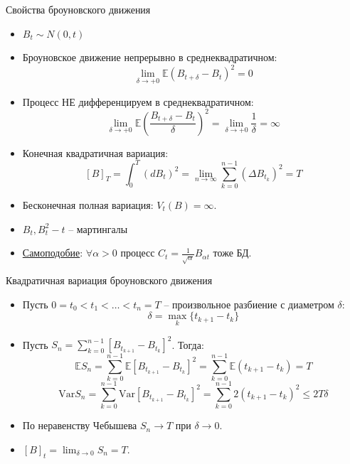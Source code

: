 \documentclass{beamer}
\begin{document}
\begin{frame}{Свойства броуновского движения}
    \begin{itemize}
        \item $B_t \sim N(0, t)$
         
        \item Броуновское движение непрерывно в среднеквадратичном:
        $$
            \lim_{\delta \to +0}\mathbb{E} \left( B_{t+\delta} - B_t \right)^2 = 0
        $$
         
        \item Процесс НЕ дифференцируем в среднеквадратичном:
        $$
            \lim_{\delta \to +0}\mathbb{E} \left(\dfrac{ B_{t+\delta} - B_t }{\delta}\right)^2 = \lim_{\delta \to +0} \dfrac{1}{\delta}  = \infty
        $$
         
        \item Конечная квадратичная вариация:
        $$
            \left[ B \right]_T = \int_0^T (dB_t)^2 = \lim_{n\to \infty} \sum_{k=0}^{n-1} \left(\Delta B_{t_k}\right)^2 = T
        $$
        \item Бесконечная полная вариация: $V_t(B) = \infty$.
        \item $B_t, B_t^2-t$ -- мартингалы
        \item \href{https://ru.wikipedia.org/wiki/Винеровский_процесс#/media/Файл:Wiener_process_animated.gif}{Самоподобие}: $\forall \alpha > 0$  процесс $C_t = \frac{1}{\sqrt{\alpha}} B_{\alpha t}$ тоже БД.
    \end{itemize}
\end{frame}

\begin{frame}{Квадратичная вариация броуновского движения}
    \begin{itemize}
        \item Пусть $0 = t_0 < t_1 < \ldots < t_n = T$ -- произвольное разбиение с диаметром $\delta$: 
        $$\delta = \max_k \{t_{k+1} - t_k\}$$
        \item Пусть $S_n = \sum_{k=0}^{n-1} \left[B_{t_{k+1}} - B_{t_k}\right]^2$. Тогда:
        $$\mathbb{E} S_n = \sum_{k=0}^{n-1} \mathbb{E} \left[B_{t_{k+1}} - B_{t_k}\right]^2
        = \sum_{k=0}^{n-1} \mathbb{E} (t_{k+1}-t_k) = T$$
        $$\mathrm{Var} S_n = \sum_{k=0}^{n-1} \mathrm{Var} \left[B_{t_{k+1}} - B_{t_k}\right]^2
        = \sum_{k=0}^{n-1} 2 (t_{k+1}-t_k)^2 \leq 2 T \delta$$
        
        \item По неравенству Чебышева $S_n \to T$ при $\delta \to 0$.
        \item $[B]_t = \lim_{\delta\to 0} S_n = T$.
    \end{itemize}
\end{frame}
\end{document}

